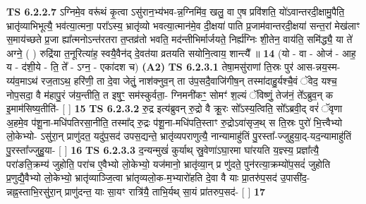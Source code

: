 \documentclass[17pt]{extarticle}
\begin{document}
                  \newline
                                \textbf{ TS 6.2.2.7} \newline
                  ऽग्निमे॒व वरू॑थं कृ॒त्वा ऽसु॑रान॒भ्य॑भव-न्न॒ग्निमि॑व॒ खलु॒ वा ए॒ष प्रवि॑शति॒ यो॑ऽवान्तरदी॒क्षामु॒पैति॒ भ्रातृ॑व्याभिभूत्यै॒ भव॑त्या॒त्मना॒ परा᳚ऽस्य॒ भ्रातृ॑व्यो भवत्या॒त्मान॑मे॒व दी॒क्षया॑ पाति प्र॒जाम॑वान्तरदी॒क्षया॑ सन्त॒रां मेख॑लाꣳ स॒माय॑च्छते प्र॒जा ह्या᳚त्मनोऽन्त॑रतरा त॒प्तव्र॑तो भवति॒ मद॑न्तीभिर्मार्जयते॒ निर्ह्य॑ग्निः शी॒तेन॒ वाय॑ति॒ समि॑द्ध्यै॒ या ते॑ अग्ने॒ ( ) रुद्रि॑या त॒नूरित्या॑ह॒ स्वयै॒वैन॑द् दे॒वत॑या व्रतयति सयोनि॒त्वाय॒ शान्त्यै᳚ ॥ \textbf{  14 } \newline
                  \newline
                      (यो - वा - ओज॑ - आह॒ य - द॑शी॒ये - ति॒ ते᳚ - ऽग्न॒ - एका॑दश च)  \textbf{(A2)} \newline \newline
                                        \textbf{ TS 6.2.3.1} \newline
                  तेषा॒मसु॑राणां ति॒स्रः पुर॑ आस-न्नय॒स्म-य्य॑व॒माऽथ॑ रज॒ताऽथ॒ हरि॑णी॒ ता दे॒वा जेतुं॒ नाश॑क्नुव॒न् ता उ॑प॒सदै॒वाजि॑गीष॒न् तस्मा॑दाहु॒र्यश्चै॒वं ॅवेद॒ यश्च॒ नोप॒सदा॒ वै म॑हापु॒रं ज॑य॒न्तीति॒ त इषुꣳ॒॒ सम॑स्कुर्वता॒- ग्निमनी॑कꣳ॒॒ सोमꣳ॑ श॒ल्यं ॅविष्णुं॒ तेज॑नं॒ ते᳚ऽब्रुव॒न् क इ॒माम॑सिष्य॒तीति॑- [  ] \textbf{  15} \newline
                  \newline
                                \textbf{ TS 6.2.3.2} \newline
                  रु॒द्र इत्य॑ब्रुवन् रु॒द्रो वै क्रू॒रः सो᳚ऽस्य॒त्विति॒ सो᳚ऽब्रवी॒द् वरं॑ ॅवृणा अ॒हमे॒व प॑शू॒ना-मधि॑पतिरसा॒नीति॒ तस्मा᳚द् रु॒द्रः प॑शू॒ना-मधि॑पति॒स्ताꣳ रु॒द्रोऽवा॑सृज॒थ् स ति॒स्रः पुरो॑ भि॒त्त्वैभ्यो लो॒केभ्यो- ऽसु॑रा॒न् प्राणु॑दत॒ यदु॑प॒सद॑ उपस॒द्यन्ते॒ भ्रातृ॑व्यपराणुत्यै॒ नान्यामाहु॑तिं पु॒रस्ता᳚-ज्जुहुया॒द्-यद॒न्यामाहु॑तिं पु॒रस्ता᳚ज्जुहु॒या- [  ] \textbf{  16} \newline
                  \newline
                                \textbf{ TS 6.2.3.3} \newline
                  द॒न्यन्मुखं॑ कुर्याथ् स्रु॒वेणा॑ऽघा॒रमा घा॑रयति य॒ज्ञ्स्य॒ प्रज्ञा᳚त्यै॒ परा॑ङति॒क्रम्य॑ जुहोति॒ परा॑च ए॒वैभ्यो लो॒केभ्यो॒ यज॑मानो॒ भ्रातृ॑व्या॒न् प्र णु॑दते॒ पुन॑रत्या॒क्रम्यो॑प॒सदं॑ जुहोति प्र॒णुद्यै॒वैभ्यो लो॒केभ्यो॒ भ्रातृ॑व्याञ्जि॒त्वा भ्रा॑तृव्यलो॒क-म॒भ्यारो॑हति दे॒वा वै याः प्रा॒तरु॑प॒सद॑ उ॒पासी॑द॒-न्नह्न॒स्ताभि॒रसु॑रा॒न् प्राणु॑दन्त॒ याः सा॒यꣳ रात्रि॑यै॒ ताभि॒र्यथ् सा॒यं प्रा॑तरुप॒सद॑- [  ] \textbf{  17} \newline
\end{document}
